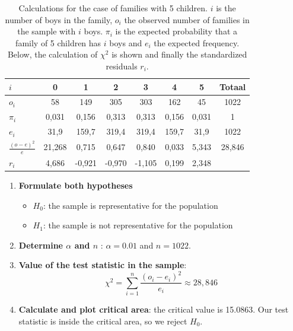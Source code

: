 \begin{table}
  \centering
  \begin{tabular}{lSSSSSSS}
    \toprule
    $i$                   & 0      & 1      & 2      & 3      & 4     & 5     & Totaal \\
    \midrule
    $o_i$                 & 58     & 149    & 305    & 303    & 162   & 45    & 1022   \\
    $\pi_i$               & 0,031  & 0,156  & 0,313  & 0,313  & 0,156 & 0,031 & 1      \\
    $e_i$                 & 31,9   & 159,7  & 319,4  & 319,4  & 159,7 & 31,9  & 1022   \\
    $\frac{(o-e)^{2}}{e}$ & 21,268 & 0,715  & 0,647  & 0,840  & 0,033 & 5,343 & 28,846 \\
    $r_i$                 & 4,686  & -0,921 & -0,970 & -1,105 & 0,199 & 2,348 &        \\
    \bottomrule
  \end{tabular}
  \caption{Calculations for the case of families with 5 children. $i$ is the number of boys in the family, $o_i$ the observed number of families in the sample with $i$ boys. $\pi_i$ is the expected probability that a family of 5 children has $i$ boys and $e_i$ the expected frequency. Below, the calculation of $\chi^2$ is shown and finally the standardized residuals $r_i$.}
  \label{tab:5-children-calculations}
\end{table}

\begin{enumerate}
  \item \textbf{Formulate both hypotheses}
  
  \begin{itemize}
    \item $H_{0}$: the sample is representative for the population
    \item $H_{1}$: the sample is not representative for the population
  \end{itemize}
  \item \textbf{Determine $\alpha$ and $n$} : $\alpha = 0.01$ and $n = 1022$.
  \item \textbf{Value of the test statistic in the sample}:
  \[ \chi^{2} = \sum_{i=1}^{n} \frac{(o_{i} - e_{i})^{2}}{e_{i}} \approx 28,846 \]
  \item \textbf{Calculate and plot critical area}:  the critical value is 15.0863. Our test statistic is inside the critical area, so we reject $H_{0}$. 
\end{enumerate}

